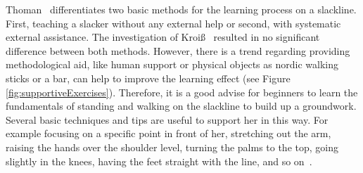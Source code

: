 Thoman~\cite{Thomann2013-aa} differentiates two basic methods for the learning process on a slackline.
First, teaching a slacker without any external help or second, with systematic external assistance.
The investigation of Kroiß~\cite{Kroiss2007-ab} resulted in no significant difference between both methods.
However, there is a trend regarding providing methodological aid, like human support or physical objects as nordic walking sticks or a bar, can help to improve the learning effect (see Figure \ref{fig:supportiveExercises}).
Therefore, it is a good advise for beginners to learn the fundamentals of standing and walking on the slackline to build up a groundwork.
Several basic techniques and tips are useful to support her in this way.
For example focusing on a specific point in front of her, stretching out the arm, raising the hands over the shoulder level, turning the palms to the top, going slightly in the knees, having the feet straight with the line, and so on~\cite{Kleindl2011-bl, Kroiss2007-ab}.

